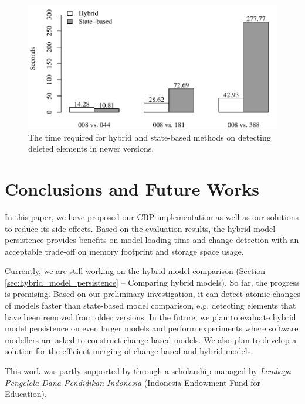 \documentclass[sigplan,review,anonymous]{acmart}\settopmatter{printfolios=true,printccs=false,printacmref=false}
\begin{document}
\begin{figure}
    \includegraphics[width=\linewidth]{images/delete_detection_epsilon_average}
    \caption{The time required for hybrid and state-based methods on detecting deleted elements in newer versions.}
    \label{fig:delete_detection_epsilon_average}
\end{figure}

\section{Conclusions and Future Works}
In this paper, we have proposed our CBP implementation as well as our solutions to reduce its side-effects. Based on the evaluation results, the hybrid model persistence provides benefits on model loading time and change detection with an acceptable trade-off on memory footprint and storage space usage. 

Currently, we are still working on the hybrid model comparison (Section \ref{sec:hybrid_model_persistence} -- Comparing hybrid models). So far, the progress is promising. Based on our preliminary investigation, it can detect atomic changes of models faster than state-based model comparison, e.g. detecting elements that have been removed from older versions. In the future, we plan to evaluate hybrid model persistence on even larger models and perform experiments where software modellers are asked to construct change-based models. We also plan to develop a solution for the efficient merging of change-based and hybrid models. 



\begin{acks}                            %
This work was partly supported by through a scholarship managed by \emph{Lembaga Pengelola Dana Pendidikan Indonesia} (Indonesia Endowment Fund for Education).
\end{acks}




\end{document}
